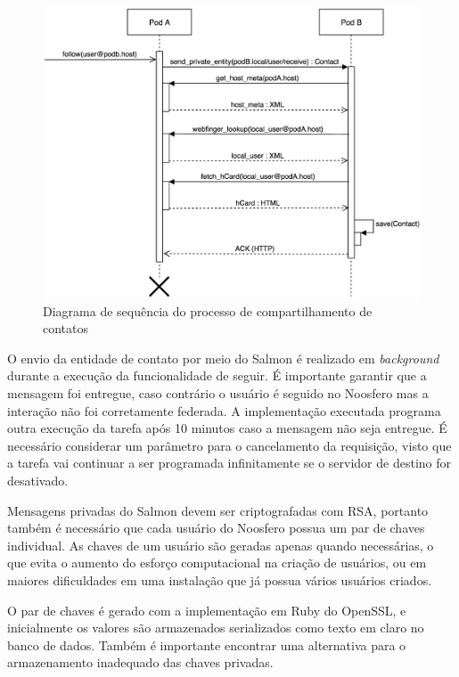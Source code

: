 \begin{figure}[h]
	\centering
		\includegraphics[keepaspectratio=true,scale=0.6]{figuras/seq_contato.eps}
	\caption{Diagrama de sequência do processo de compartilhamento de contatos}
	\label{fig:seq_contato}
\end{figure}

O envio da entidade de contato por meio do Salmon é realizado em \textit{background}
durante a execução da funcionalidade de seguir. É importante garantir que a mensagem
foi entregue, caso contrário o usuário é seguido no Noosfero mas a interação não foi
corretamente federada. A implementação executada programa outra execução da tarefa
após 10 minutos caso a mensagem não seja entregue. É necessário considerar um
parâmetro para o cancelamento da requisição, visto que a tarefa vai continuar a ser
programada infinitamente se o servidor de destino for desativado.

Mensagens privadas do Salmon devem ser criptografadas com RSA, portanto também é
necessário que cada usuário do Noosfero possua um par de chaves individual. As
chaves de um usuário são geradas apenas quando necessárias, o que evita o aumento do
esforço computacional na criação de usuários, ou em maiores dificuldades em uma
instalação que já possua vários usuários criados.

O par de chaves é gerado com a implementação em Ruby do OpenSSL, e inicialmente os
valores são armazenados serializados como texto em claro no banco de dados. Também
é importante encontrar uma alternativa para o armazenamento inadequado das chaves
privadas.

